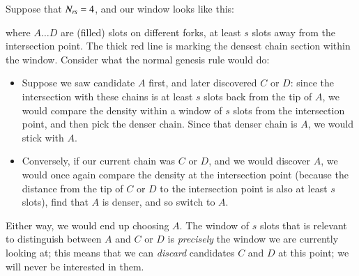 Suppose that $N_\mathit{rs} = 4$, and our window looks like this:
%
\begin{center}
\end{center}
%
where $A \ldots D$ are (filled) slots on different forks, at least  $s$ slots
away from the intersection point. The thick red line is marking the densest
chain section within the window. Consider what the normal genesis rule would do:
%
\begin{itemize}
\item
Suppose we saw candidate $A$ first, and later discovered $C$ or $D$: since the
intersection with these chains is at least $s$ slots back from the tip of
$A$, we would compare the density within a window of $s$ slots from the
intersection point, and then pick the  denser chain. Since that denser chain is
$A$, we would stick with $A$.
\item
Conversely, if our current chain was $C$ or $D$, and we would discover $A$, we
would once again compare the density at the intersection point (because  the
distance from the tip of $C$ or $D$ to the intersection point is also at least
$s$ slots), find that $A$ is denser, and so switch to $A$.
\end{itemize}
%
Either way, we would end up choosing $A$. The window of $s$ slots that is relevant
to distinguish between $A$ and $C$ or $D$ is \emph{precisely} the window we are
currently looking at; this means that we can \emph{discard} candidates $C$
and $D$ at this point; we will never be interested in them.

